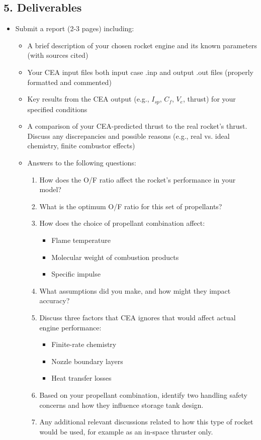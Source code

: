 \documentclass[12pt]{article}
\begin{document}
\subsection{5. Deliverables}
\begin{itemize}
    \item Submit a report (2-3 pages) including:
    \begin{itemize}
        \item A brief description of your chosen rocket engine and its known parameters (with sources cited)
        \item Your CEA input files both input case .inp and output .out files (properly formatted and commented)
        \item Key results from the CEA output (e.g., $I_{sp}$, $C_f$, $V_e$, thrust) for your specified conditions
        \item A comparison of your CEA-predicted thrust to the real rocket's thrust. Discuss any discrepancies and possible reasons (e.g., real vs. ideal chemistry, finite combustor effects)
        \item Answers to the following questions:
        \begin{enumerate}
            \item How does the O/F ratio affect the rocket's performance in your model?
            \item What is the optimum O/F ratio for this set of propellants?
            \item How does the choice of propellant combination affect:
            \begin{itemize}
                \item Flame temperature
                \item Molecular weight of combustion products
                \item Specific impulse
            \end{itemize}
            \item What assumptions did you make, and how might they impact accuracy?
            \item Discuss three factors that CEA ignores that would affect actual engine performance:
            \begin{itemize}
                \item Finite-rate chemistry
                \item Nozzle boundary layers
                \item Heat transfer losses
            \end{itemize}
            \item Based on your propellant combination, identify two handling safety concerns and how they influence storage tank design.
            \item Any additional relevant discussions related to how this type of rocket would be used, for example as an in-space thruster only.
        \end{enumerate}
    \end{itemize}
\end{itemize}
\end{document}
